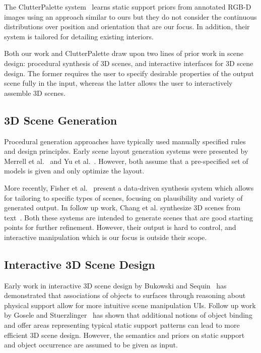 \documentclass{sigchi}
\begin{document}
The ClutterPalette system~\cite{yu2014clutterpalette} learns static support priors from annotated RGB-D images using an approach similar to ours but they do not consider the continuous distributions over position and orientation that are our focus.  In addition, their system is tailored for detailing existing interiors.

Both our work and ClutterPalette draw upon two lines of prior work in scene design: procedural synthesis of 3D scenes, and interactive interfaces for 3D scene design.  The former requires the user to specify desirable properties of the output scene fully in the input, whereas the latter allows the user to interactively assemble 3D scenes.

\subsection{3D Scene Generation}

Procedural generation approaches have typically used manually specified rules and design principles.  Early scene layout generation systems were presented by Merrell et al.~\cite{merrell2011interactive} and Yu et al.~\cite{yu2011make}.  However, both assume that a pre-specified set of models is given and only optimize the layout.

More recently, Fisher et al.~\cite{fisher2012example} present a data-driven synthesis system which allows for tailoring to specific types of scenes, focusing on plausibility and variety of generated output.  In follow up work, Chang et al. synthesize 3D scenes from text~\cite{chang2014spatial}.  Both these systems are intended to generate scenes that are good starting points for further refinement.  However, their output is hard to control, and interactive manipulation which is our focus is outside their scope.

\subsection{Interactive 3D Scene Design}

Early work in interactive 3D scene design by Bukowski and Sequin~\cite{bukowski1995object} has demonstrated that associations of objects to surfaces through reasoning about physical support allow for more intuitive scene manipulation UIs.  Follow up work by Gosele and Stuerzlinger~\cite{gosele1999semantic} has shown that additional notions of object binding and offer areas representing typical static support patterns can lead to more efficient 3D scene design.  However, the semantics and priors on static support and object occurrence are assumed to be given as input.
\end{document}
